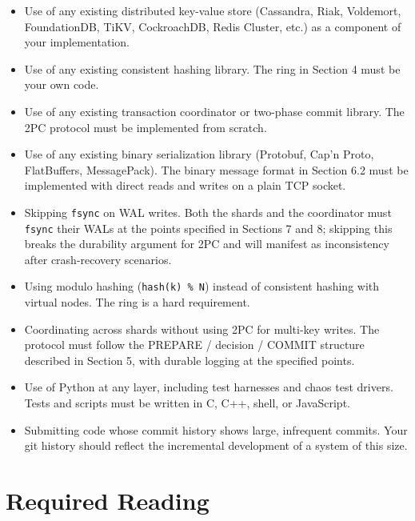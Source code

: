 \documentclass[11pt,a4paper]{article}
\begin{document}
\begin{notebox}
\begin{itemize}
\item Use of any existing distributed key-value store (Cassandra, Riak, Voldemort, FoundationDB, TiKV, CockroachDB, Redis Cluster, etc.) as a component of your implementation.

\item Use of any existing consistent hashing library. The ring in Section 4 must be your own code.

\item Use of any existing transaction coordinator or two-phase commit library. The 2PC protocol must be implemented from scratch.

\item Use of any existing binary serialization library (Protobuf, Cap'n Proto, FlatBuffers, MessagePack). The binary message format in Section 6.2 must be implemented with direct reads and writes on a plain TCP socket.

\item Skipping \texttt{fsync} on WAL writes. Both the shards and the coordinator must \texttt{fsync} their WALs at the points specified in Sections 7 and 8; skipping this breaks the durability argument for 2PC and will manifest as inconsistency after crash-recovery scenarios.

\item Using modulo hashing (\texttt{hash(k) \% N}) instead of consistent hashing with virtual nodes. The ring is a hard requirement.

\item Coordinating across shards without using 2PC for multi-key writes. The protocol must follow the PREPARE / decision / COMMIT structure described in Section 5, with durable logging at the specified points.

\item Use of Python at any layer, including test harnesses and chaos test drivers. Tests and scripts must be written in C, C++, shell, or JavaScript.

\item Submitting code whose commit history shows large, infrequent commits. Your git history should reflect the incremental development of a system of this size.
\end{itemize}
\end{notebox}

\section{Required Reading}
\end{document}

